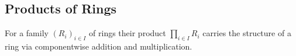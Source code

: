 \subsection{Products of Rings}


\begin{fluff}
  For a family $(R_i)_{i \in I}$ of rings their product $\prod_{i \in I} R_i$ carries the structure of a ring via componentwise addition and multiplication.
\end{fluff}





% 
% 
% 
% 
% 
% 




